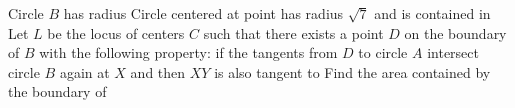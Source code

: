 Circle $B$ has radius   Circle  centered at point  has radius $\sqrt{7}$ and is contained in   Let $L$ be the locus of centers $C$ such that there exists a point $D$ on the boundary of $B$ with the following property: if the tangents from $D$ to circle $A$ intersect circle $B$ again at $X$ and  then $XY$ is also tangent to   Find the area contained by the boundary of 